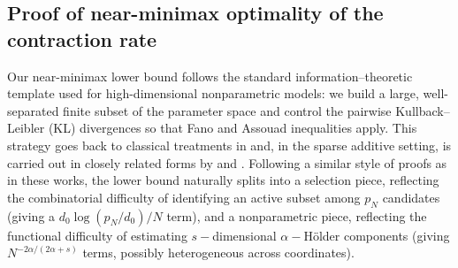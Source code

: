 \documentclass[11pt]{article}
\theoremstyle{plain}
\theoremstyle{definition}
\theoremstyle{plain}
\begin{document}



\subsection{Proof of near-minimax optimality of the contraction rate}
\label{sec:minimax}
Our near-minimax lower bound follows the standard information–theoretic template used for high-dimensional nonparametric models: we build a large, well-separated finite subset of the parameter space and control the pairwise Kullback–Leibler (KL) divergences so that Fano and Assouad inequalities apply. This strategy goes back to classical treatments in \citet{Tsybakov2009} and, in the sparse additive setting, is carried out in closely related forms by \citet{Koltchinskii2010} and \citet{raskutti2009minimaxratesestimationhighdimensional}. Following a similar style of proofs as in these works, the lower bound naturally splits into a selection piece, reflecting the combinatorial difficulty of identifying an active subset among $p_N$ candidates (giving a $d_0 \log(p_N/d_0)/N$ term), and a nonparametric piece, reflecting the functional difficulty of estimating $s-$dimensional $\alpha-$H\"older components (giving $N^{-2\alpha/(2 \alpha+s)}$ terms, possibly heterogeneous across coordinates). 
\end{document}
